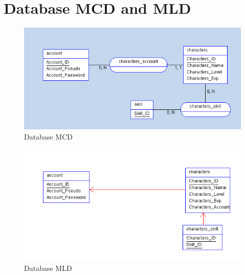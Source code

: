 \documentclass{scrreprt}
\begin{document}
\chapter{Database MCD and MLD}
		  \begin{figure}[h]		
		  \begin{center}
		  \includegraphics[scale=0.5]{mcd.png}
		  \end{center}
		  \caption{Database MCD}
		  \end{figure}

		  \begin{figure}[h]		
		  \begin{center}
		  \includegraphics[scale=0.5]{mld.jpg}
		  \end{center}
		  \caption{Database MLD}
		  \end{figure}

					
\end{document}
